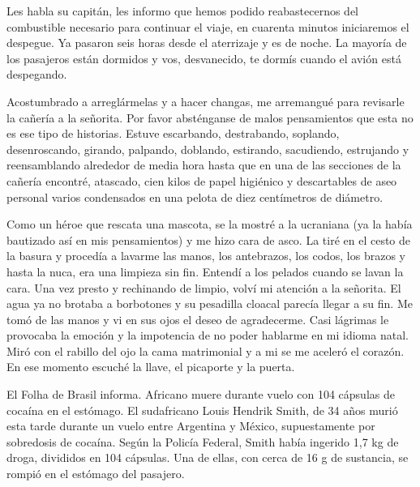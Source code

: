 \documentclass[11pt,twoside,openright,a6paper]{book}
\begin{document}
Les habla su capitán, les informo que hemos podido reabastecernos
del combustible necesario para continuar el viaje, en cuarenta minutos
iniciaremos el despegue. Ya pasaron seis horas desde el aterrizaje y es
de noche. La mayoría de los pasajeros están dormidos y vos, desvanecido,
te dormís cuando el avión está despegando.


\vspace{0.5cm}
\hrulefill\hspace{0.2cm} \decofourleft\decofourright \hspace{0.2cm} \hrulefill
\vspace{0.5cm}

  Acostumbrado a
arreglármelas y a hacer changas, me arremangué para revisarle la cañería a
la señorita. Por favor absténganse de malos pensamientos que esta no es ese
tipo de historias. Estuve escarbando, destrabando, soplando, desenroscando,
girando, palpando, doblando, estirando, sacudiendo, estrujando y reensamblando
alrededor de media hora hasta que en una de las secciones de la cañería
encontré, atascado, cien kilos de papel higiénico y descartables de aseo
personal varios condensados en una pelota de diez centímetros de diámetro.

Como un héroe que rescata una mascota, se la mostré a la ucraniana (ya la
había bautizado así en mis pensamientos) y me hizo cara de asco. La tiré
en el cesto de la basura y procedía a lavarme las manos, los antebrazos,
los codos, los brazos y hasta la nuca, era una limpieza sin fin. Entendí a
los pelados cuando se lavan la cara. Una vez presto y rechinando de limpio,
volví mi atención a la señorita. El agua ya no brotaba a borbotones y su
pesadilla cloacal parecía llegar a su fin. Me tomó de las manos y vi en
sus ojos el deseo de agradecerme. Casi lágrimas le provocaba la emoción
y la impotencia de no poder hablarme en mi idioma natal. Miró con el
rabillo del ojo la cama matrimonial y a mi se me aceleró el corazón. En
ese momento escuché la llave, el picaporte y la puerta.


\vspace{0.5cm}
\hrulefill\hspace{0.2cm} \decofourleft\decofourright \hspace{0.2cm} \hrulefill
\vspace{0.5cm}

El Folha de Brasil informa. Africano muere durante vuelo con 104 cápsulas
de cocaína en el estómago.  El sudafricano Louis Hendrik Smith, de
34 años murió esta tarde durante un vuelo entre Argentina y México,
supuestamente por sobredosis de cocaína.  Según la Policía Federal, Smith
había ingerido 1,7 kg de droga, divididos en 104 cápsulas. Una de ellas,
con cerca de 16 g de sustancia, se rompió en el estómago del pasajero.
\end{document}
